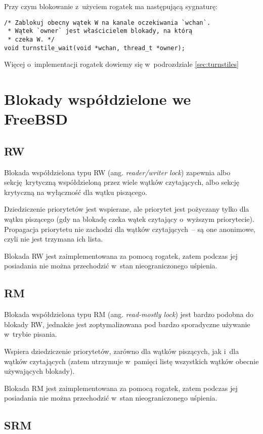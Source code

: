 \documentclass[shortabstract]{iithesis}
\theoremstyle{definition} \newtheorem*{definition}{Definicja}
\theoremstyle{definition} \newtheorem*{example}{Przykład}
\theoremstyle{definition} \newtheorem*{remark}{Uwaga}
\begin{document}
Przy czym blokowanie z~użyciem rogatek ma następującą sygnaturę:
\begin{lstlisting}
/* Zablokuj obecny wątek W na kanale oczekiwania `wchan`.
 * Wątek `owner` jest właścicielem blokady, na którą
 * czeka W. */
void turnstile_wait(void *wchan, thread_t *owner);
\end{lstlisting}

Więcej o~implementacji rogatek dowiemy się w~podrozdziale \ref{sec:turnstiles}

\section{Blokady współdzielone we FreeBSD}

\subsection{RW}

Blokada współdzielona typu RW (ang. \textit{reader/writer lock}) zapewnia albo sekcję krytyczną
współdzieloną przez wiele wątków czytających, albo sekcję krytyczną na wyłączność dla wątku piszącego.

Dziedziczenie priorytetów jest wspierane, ale priorytet jest pożyczany tylko dla wątku piszącego (gdy
na blokadę czeka wątek czytający o~wyższym priorytecie). Propagacja priorytetu nie zachodzi dla wątków
czytających~-- są one anonimowe, czyli nie jest trzymana ich lista.

Blokada RW jest zaimplementowana za pomocą rogatek, zatem podczas jej posiadania nie można przechodzić w~stan
nieograniczonego uśpienia.

\subsection{RM}

Blokada współdzielona typu RM (ang. \textit{read-mostly lock}) jest bardzo podobna do blokady RW, jednakże
jest zoptymalizowana pod bardzo sporadyczne używanie w~trybie pisania.

Wspiera dziedziczenie priorytetów, zarówno dla wątków piszących, jak i~dla wątków czytających (zatem utrzymuje
w~pamięci listę wszystkich wątków obecnie używających blokady).

Blokada RM jest zaimplementowana za pomocą rogatek, zatem podczas jej posiadania nie można przechodzić w~stan
nieograniczonego uśpienia.

\subsection{SRM}
\end{document}
